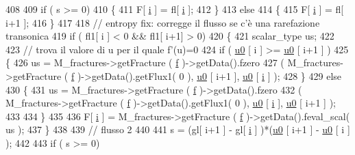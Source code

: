 \begin{DoxyCode}
408 
409         \textcolor{keywordflow}{if} ( s >= 0)
410         \{
411             F[ \hyperlink{god__e_8m_a8604be5925f4266ab5ccc69675329c80}{i} ] = fl[ \hyperlink{god__e_8m_a8604be5925f4266ab5ccc69675329c80}{i} ];
412         \}
413         \textcolor{keywordflow}{else}
414         \{
415             F[ \hyperlink{god__e_8m_a8604be5925f4266ab5ccc69675329c80}{i} ] = fl[ i+1 ];
416         \}
417 
418         \textcolor{comment}{// entropy fix: corregge il flusso se c'è una rarefazione transonica}
419         \textcolor{keywordflow}{if} ( fl1[ i ] < 0 && fl1[ i+1] > 0)
420         \{
421             scalar\_type us;
422 
423             \textcolor{comment}{// trova il valore di u per il quale f'(u)=0}
424             \textcolor{keywordflow}{if} ( \hyperlink{god__e_8m_ae060ce5868d35ef17bcb6e832da03be9}{u0} [ i ] >= \hyperlink{god__e_8m_ae060ce5868d35ef17bcb6e832da03be9}{u0} [ i+1 ] )
425             \{
426                 us = M\_fractures->getFracture ( \hyperlink{god__e_8m_a68f477f9b30a6300d5af9b02eac82f35}{f} )->getData().fzero
427                                                     ( M\_fractures->getFracture ( 
      \hyperlink{god__e_8m_a68f477f9b30a6300d5af9b02eac82f35}{f} )->getData().getFlux1( 0 ), \hyperlink{god__e_8m_ae060ce5868d35ef17bcb6e832da03be9}{u0} [ i+1 ], \hyperlink{god__e_8m_ae060ce5868d35ef17bcb6e832da03be9}{u0} [ \hyperlink{god__e_8m_a8604be5925f4266ab5ccc69675329c80}{i} ] );
428             \}
429             \textcolor{keywordflow}{else}
430             \{
431                 us = M\_fractures->getFracture ( \hyperlink{god__e_8m_a68f477f9b30a6300d5af9b02eac82f35}{f} )->getData().fzero
432                                                     ( M\_fractures->getFracture ( 
      \hyperlink{god__e_8m_a68f477f9b30a6300d5af9b02eac82f35}{f} )->getData().getFlux1( 0 ), \hyperlink{god__e_8m_ae060ce5868d35ef17bcb6e832da03be9}{u0} [ \hyperlink{god__e_8m_a8604be5925f4266ab5ccc69675329c80}{i} ], \hyperlink{god__e_8m_ae060ce5868d35ef17bcb6e832da03be9}{u0} [ i+1 ] );
433 
434             \}
435 
436             F[ \hyperlink{god__e_8m_a8604be5925f4266ab5ccc69675329c80}{i} ] = M\_fractures->getFracture ( \hyperlink{god__e_8m_a68f477f9b30a6300d5af9b02eac82f35}{f} )->getData().feval\_scal( us );
437         \}
438 
439         \textcolor{comment}{// flusso 2}
440 
441         s = (gl[ i+1 ] - gl[ \hyperlink{god__e_8m_a8604be5925f4266ab5ccc69675329c80}{i} ] )*(\hyperlink{god__e_8m_ae060ce5868d35ef17bcb6e832da03be9}{u0} [ i+1 ] - \hyperlink{god__e_8m_ae060ce5868d35ef17bcb6e832da03be9}{u0} [ i ] );
442 
443         \textcolor{keywordflow}{if} ( s >= 0)

\end{DoxyCode}
